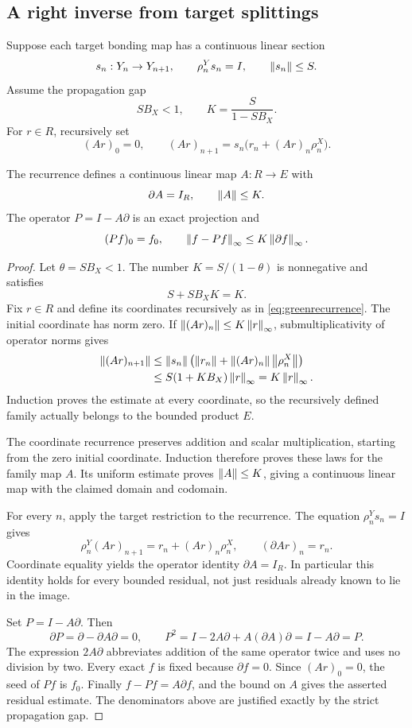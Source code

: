 \subsection{A right inverse from target splittings}
Suppose each target bonding map has a continuous linear section
\[
 s_n:Y_n\to Y_{n+1},\qquad \rho^Y_ns_n=I,\qquad \left\lVert s_n\right\rVert\le S.
\]
Assume the propagation gap
\begin{equation}\label{eq:splitgap}
 SB_X<1,\qquad K=\frac{S}{1-SB_X}.
\end{equation}
For \(r\in R\), recursively set
\begin{equation}\label{eq:greenrecurrence}
 (Ar)_0=0,\qquad
 (Ar)_{n+1}=s_n\bigl(r_n+(Ar)_n\rho^X_n\bigr).
\end{equation}

\begin{theorem}\label{KS20}
The recurrence defines a continuous linear map \(A:R\to E\) with
\[
 \partial A=I_R,\qquad \left\lVert A\right\rVert\le K.
\]
The operator \(P=I-A\partial\) is an exact projection and
\[
 (Pf)_0=f_0,\qquad
 \left\lVert f-Pf\right\rVert_\infty\le K\left\lVert\partial f\right\rVert_\infty.
\]
\end{theorem}
\begin{proof}
Let $\theta=SB_X<1$. The number $K=S/(1-\theta)$ is nonnegative and satisfies
\[
 S+SB_XK=K.
\]
Fix $r\in R$ and define its coordinates recursively as in \eqref{eq:greenrecurrence}. The initial coordinate has norm zero. If $\left\lVert(Ar)_n\right\rVert\le K\left\lVert r\right\rVert_\infty$, submultiplicativity of operator norms gives
\[
 \begin{aligned}
 \left\lVert(Ar)_{n+1}\right\rVert
 &\le\left\lVert s_n\right\rVert\bigl(\left\lVert r_n\right\rVert+\left\lVert(Ar)_n\right\rVert\left\lVert\rho^X_n\right\rVert\bigr)\\
 &\le S(1+KB_X)\left\lVert r\right\rVert_\infty=K\left\lVert r\right\rVert_\infty.
 \end{aligned}
\]
Induction proves the estimate at every coordinate, so the recursively defined family actually belongs to the bounded product $E$.

The coordinate recurrence preserves addition and scalar multiplication, starting from the zero initial coordinate. Induction therefore proves these laws for the family map $A$. Its uniform estimate proves $\left\lVert A\right\rVert\le K$, giving a continuous linear map with the claimed domain and codomain.

For every $n$, apply the target restriction to the recurrence. The equation $\rho^Y_ns_n=I$ gives
\[
 \rho^Y_n(Ar)_{n+1}=r_n+(Ar)_n\rho^X_n,
 \qquad (\partial Ar)_n=r_n.
\]
Coordinate equality yields the operator identity $\partial A=I_R$. In particular this identity holds for every bounded residual, not just residuals already known to lie in the image.

Set $P=I-A\partial$. Then
\[
 \partial P=\partial-\partial A\partial=0,\qquad
 P^2=I-2A\partial+A(\partial A)\partial=I-A\partial=P.
\]
The expression $2A\partial$ abbreviates addition of the same operator twice and uses no division by two. Every exact $f$ is fixed because $\partial f=0$. Since $(Ar)_0=0$, the seed of $Pf$ is $f_0$. Finally $f-Pf=A\partial f$, and the bound on $A$ gives the asserted residual estimate. The denominators above are justified exactly by the strict propagation gap.
\end{proof}
